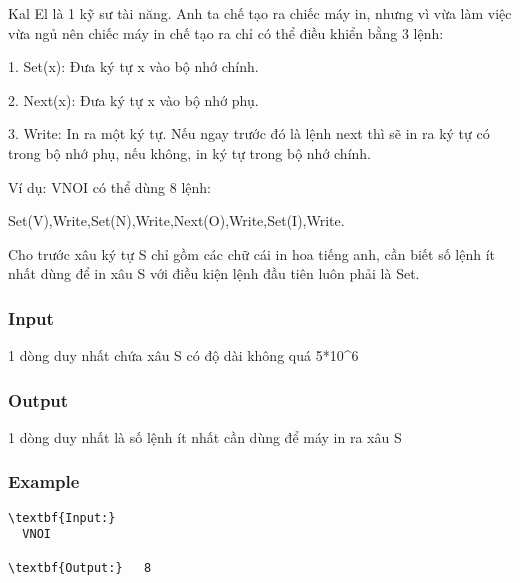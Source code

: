 



    Kal El là 1 kỹ sư tài năng. Anh ta chế tạo ra chiếc máy in, nhưng vì vừa làm việc vừa ngủ nên chiếc máy in chế tạo ra chỉ có thể điều khiển bằng 3 lệnh:   

    1. Set(x): Đưa ký tự x vào bộ nhớ chính.   

    2. Next(x): Đưa ký tự x vào bộ nhớ phụ.   

    3. Write: In ra một ký tự. Nếu ngay trước đó là lệnh next thì sẽ in ra ký tự có trong bộ nhớ phụ, nếu không, in ký tự trong bộ nhớ chính.   

    Ví dụ: VNOI có thể dùng 8 lệnh:   

    Set(V),Write,Set(N),Write,Next(O),Write,Set(I),Write.   

    Cho trước xâu ký tự S chỉ gồm các chữ cái in hoa tiếng anh, cần biết số lệnh ít nhất dùng để in xâu S với điều kiện lệnh đầu tiên luôn phải là Set.   

\subsubsection{    Input   }

    1 dòng duy nhất chứa xâu S có độ dài không quá 5*10\textasciicircum6   

\subsubsection{    Output   }

    1 dòng duy nhất là số lệnh ít nhất cần dùng để máy in ra xâu S   

\subsubsection{    Example   }
\begin{verbatim}
\textbf{Input:}
  VNOI

\textbf{Output:}   8\end{verbatim}